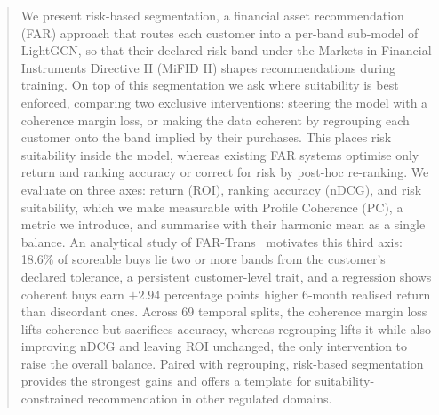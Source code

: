 \begin{abstract}
We present risk-based segmentation, a financial asset recommendation (FAR) approach that routes each customer into a per-band sub-model of LightGCN, so that their declared risk band under the Markets in Financial Instruments Directive II (MiFID II) shapes recommendations during training. On top of this segmentation we ask where suitability is best enforced, comparing two exclusive interventions: steering the model with a coherence margin loss, or making the data coherent by regrouping each customer onto the band implied by their purchases. This places risk suitability inside the model, whereas existing FAR systems optimise only return and ranking accuracy or correct for risk by post-hoc re-ranking. We evaluate on three axes: return (ROI), ranking accuracy (nDCG), and risk suitability, which we make measurable with Profile Coherence (PC), a metric we introduce, and summarise with their harmonic mean as a single balance. An analytical study of FAR-Trans~\cite{sanzcruzado2024fartransinvestmentdatasetfinancial} motivates this third axis: 18.6\% of scoreable buys lie two or more bands from the customer's declared tolerance, a persistent customer-level trait, and a regression shows coherent buys earn $+2.94$ percentage points higher 6-month realised return than discordant ones. Across 69 temporal splits, the coherence margin loss lifts coherence but sacrifices accuracy, whereas regrouping lifts it while also improving nDCG and leaving ROI unchanged, the only intervention to raise the overall balance. Paired with regrouping, risk-based segmentation provides the strongest gains and offers a template for suitability-constrained recommendation in other regulated domains.
\end{abstract}

